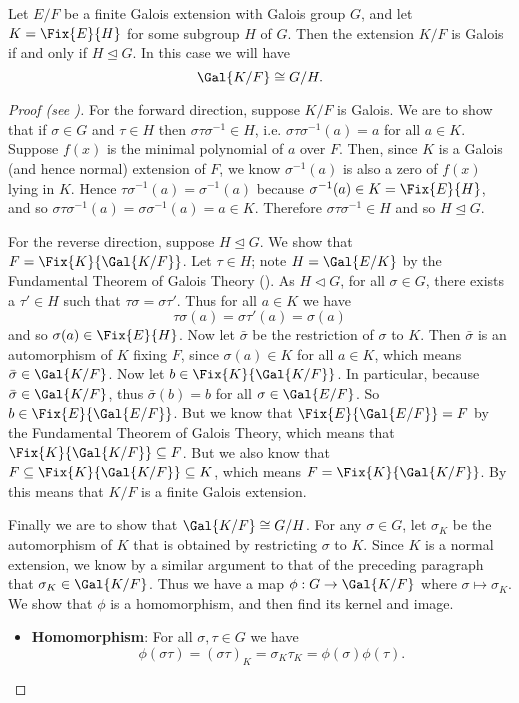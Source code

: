 \begin{theorem}\label{thrm-intermediate-field-that-is-galois-extension-of-base-field-iff-subgroup-is-normal}
    Let $E/F$ be a finite Galois extension with Galois group $G$, and let $K = \Fix{E}{H}$ for some subgroup $H$ of $G$. Then the extension $K/F$ is Galois if and only if $H \unlhd G$. In this case we will have
    \[
        \Gal{K/F} \cong G/H.
    \]
\end{theorem}
\begin{proof}[Proof (see {\cite[Theorem 23.23, Statment 4]{judson_beezer_2022}})]
    For the forward direction, suppose $K/F$ is Galois. We are to show that if $\sigma \in G$ and $\tau \in H$ then $\sigma\tau\sigma^{-1} \in H$, i.e. $\sigma\tau\sigma^{-1}(a) = a$ for all $a \in K$. Suppose $f(x)$ is the minimal polynomial of $a$ over $F$. Then, since $K$ is a Galois (and hence normal) extension of $F$, we know $\sigma^{-1}(a)$ is also a zero of $f(x)$ lying in $K$. Hence $\tau\sigma^{-1}(a) = \sigma^{-1}(a)$ because $\sigma^{-1}(a) \in K = \Fix{E}{H}$, and so $\sigma\tau\sigma^{-1}(a) = \sigma\sigma^{-1}(a) = a \in K$. Therefore $\sigma\tau\sigma^{-1} \in H$ and so $H \unlhd G$.

    For the reverse direction, suppose $H \unlhd G$. We show that $F = \Fix{K}{\Gal{K/F}}$. Let $\tau \in H$; note $H = \Gal{E/K}$ by the Fundamental Theorem of Galois Theory (). As $H \lhd G$, for all $\sigma \in G$, there exists a $\tau' \in H$ such that $\tau\sigma = \sigma\tau'$. Thus for all $a \in K$ we have
    \[
        \tau\sigma(a) = \sigma\tau'(a) = \sigma(a)
    \]
    and so $\sigma(a) \in \Fix{E}{H}$. Now let $\bar{\sigma}$ be the restriction of $\sigma$ to $K$. Then $\bar{\sigma}$ is an automorphism of $K$ fixing $F$, since $\sigma(a) \in K$ for all $a \in K$, which means $\bar{\sigma} \in \Gal{K/F}$. Now let $b \in \Fix{K}{\Gal{K/F}}$. In particular, because $\bar{\sigma} \in \Gal{K/F}$, thus $\bar{\sigma}(b) = b$ for all $\sigma \in \Gal{E/F}$. So $b \in \Fix{E}{\Gal{E/F}}$. But we know that $\Fix{E}{\Gal{E/F}} = F$ by the Fundamental Theorem of Galois Theory, which means that $\Fix{K}{\Gal{K/F}} \subseteq F$. But we also know that $F \subseteq \Fix{K}{\Gal{K/F}} \subseteq K$, which means $F = \Fix{K}{\Gal{K/F}}$. By  this means that $K/F$ is a finite Galois extension.

    Finally we are to show that $\Gal{K/F} \cong G/H$. For any $\sigma \in G$, let $\sigma_K$ be the automorphism of $K$ that is obtained by restricting $\sigma$ to $K$. Since $K$ is a normal extension, we know by a similar argument to that of the preceding paragraph that $\sigma_K \in \Gal{K/F}$. Thus we have a map $\phi: G \to \Gal{K/F}$ where $\sigma \mapsto \sigma_K$. We show that $\phi$ is a homomorphism, and then find its kernel and image.
    \begin{itemize}
        \item \textbf{Homomorphism}: For all $\sigma, \tau \in G$ we have
        \[
            \phi(\sigma\tau) = (\sigma\tau)_K = \sigma_K\tau_K = \phi(\sigma)\phi(\tau).
        \]
        

\end{itemize}
\end{proof}
